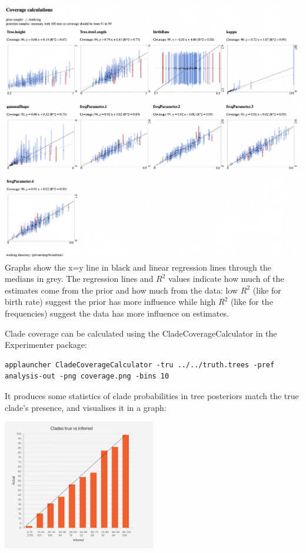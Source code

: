 \documentclass[oneside]{article}
\begin{document}
   \includegraphics[width=\textwidth]{../figures/coveragecalculator.png}
   {
   Graphs show the x=y line in black and linear regression lines through the medians in grey.
   The regression lines and $R^2$ values indicate how much of the estimates come from the prior and how much from the data:
   low $R^2$ (like for birth rate) suggest the prior has more influence while high $R^2$ (like for the frequencies) suggest the data has more influence on estimates.
   }


Clade coverage can be calculated using the CladeCoverageCalculator in the Experimenter package:

{\scriptsize
\begin{lstlisting}
applauncher CladeCoverageCalculator -tru ../../truth.trees -pref analysis-out -png coverage.png -bins 10
\end{lstlisting}
}

It produces some statistics of clade probabilities in tree posteriors match the true clade's presence, and visualises it in a graph:

\begin{center}
   \includegraphics[width=0.5\textwidth]{../figures/experimentercoverage.png}
\end{center}
\end{document}
